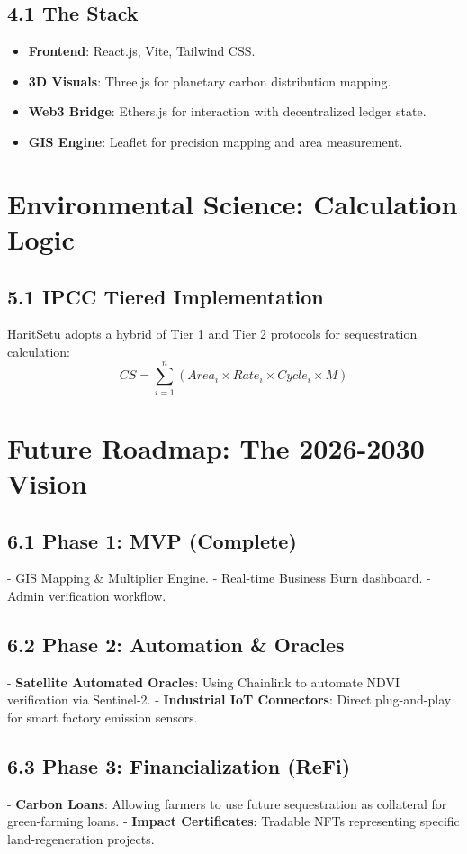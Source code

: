 \documentclass[11pt,a4paper]{article}
\begin{document}
\subsection{4.1 The Stack}
\begin{itemize}
    \item \textbf{Frontend}: React.js, Vite, Tailwind CSS.
    \item \textbf{3D Visuals}: Three.js for planetary carbon distribution mapping.
    \item \textbf{Web3 Bridge}: Ethers.js for interaction with decentralized ledger state.
    \item \textbf{GIS Engine}: Leaflet for precision mapping and area measurement.
\end{itemize}

\section{Environmental Science: Calculation Logic}
\subsection{5.1 IPCC Tiered Implementation}
HaritSetu adopts a hybrid of Tier 1 and Tier 2 protocols for sequestration calculation:
\begin{equation}
    CS = \sum_{i=1}^{n} (Area_i \times Rate_i \times Cycle_i \times M)
\end{equation}

\section{Future Roadmap: The 2026-2030 Vision}
\subsection{6.1 Phase 1: MVP (Complete)}
- GIS Mapping & Multiplier Engine.
- Real-time Business Burn dashboard.
- Admin verification workflow.

\subsection{6.2 Phase 2: Automation & Oracles}
- \textbf{Satellite Automated Oracles}: Using Chainlink to automate NDVI verification via Sentinel-2.
- \textbf{Industrial IoT Connectors}: Direct plug-and-play for smart factory emission sensors.

\subsection{6.3 Phase 3: Financialization (ReFi)}
- \textbf{Carbon Loans}: Allowing farmers to use future sequestration as collateral for green-farming loans.
- \textbf{Impact Certificates}: Tradable NFTs representing specific land-regeneration projects.
\end{document}
